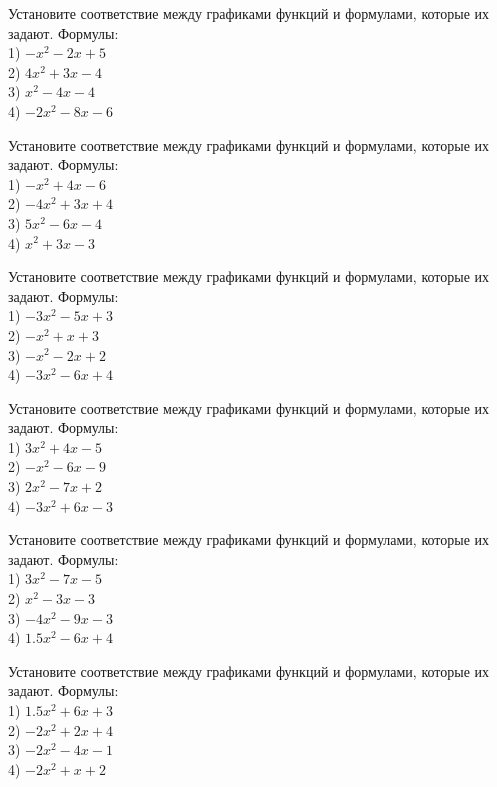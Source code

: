 \documentclass[4apaper]{article}
\begin{document}
\begin{taskBN}{57}
Установите соответствие между графиками функций и формулами, которые их задают. Формулы: \\1) $-x^2-2x+5$\\2) $4x^2+3x-4$\\3) $x^2-4x-4$\\4) $-2x^2-8x-6$
\end{taskBN}

\begin{taskBN}{58}
Установите соответствие между графиками функций и формулами, которые их задают. Формулы: \\1) $-x^2+4x-6$\\2) $-4x^2+3x+4$\\3) $5x^2-6x-4$\\4) $x^2+3x-3$
\end{taskBN}

\begin{taskBN}{59}
Установите соответствие между графиками функций и формулами, которые их задают. Формулы: \\1) $-3x^2-5x+3$\\2) $-x^2+x+3$\\3) $-x^2-2x+2$\\4) $-3x^2-6x+4$
\end{taskBN}

\begin{taskBN}{60}
Установите соответствие между графиками функций и формулами, которые их задают. Формулы: \\1) $3x^2+4x-5$\\2) $-x^2-6x-9$\\3) $2x^2-7x+2$\\4) $-3x^2+6x-3$
\end{taskBN}

\begin{taskBN}{61}
Установите соответствие между графиками функций и формулами, которые их задают. Формулы: \\1) $3x^2-7x-5$\\2) $x^2-3x-3$\\3) $-4x^2-9x-3$\\4) $1.5x^2-6x+4$
\end{taskBN}

\begin{taskBN}{62}
Установите соответствие между графиками функций и формулами, которые их задают. Формулы: \\1) $1.5x^2+6x+3$\\2) $-2x^2+2x+4$\\3) $-2x^2-4x-1$\\4) $-2x^2+x+2$
\end{taskBN}
\end{document}
